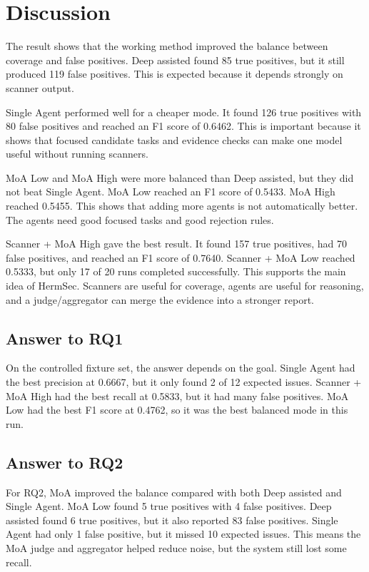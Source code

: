 \documentclass[sigconf,nonacm]{acmart}
\begin{document}
\section{Discussion}

The result shows that the working method improved the balance between coverage and false positives. Deep assisted found 85 true positives, but it still produced 119 false positives. This is expected because it depends strongly on scanner output.

Single Agent performed well for a cheaper mode. It found 126 true positives with 80 false positives and reached an F1 score of 0.6462. This is important because it shows that focused candidate tasks and evidence checks can make one model useful without running scanners.

MoA Low and MoA High were more balanced than Deep assisted, but they did not beat Single Agent. MoA Low reached an F1 score of 0.5433. MoA High reached 0.5455. This shows that adding more agents is not automatically better. The agents need good focused tasks and good rejection rules.

Scanner + MoA High gave the best result. It found 157 true positives, had 70 false positives, and reached an F1 score of 0.7640. Scanner + MoA Low reached 0.5333, but only 17 of 20 runs completed successfully. This supports the main idea of HermSec. Scanners are useful for coverage, agents are useful for reasoning, and a judge/aggregator can merge the evidence into a stronger report.

\subsection{Answer to RQ1}
On the controlled fixture set, the answer depends on the goal. Single Agent had the best precision at 0.6667, but it only found 2 of 12 expected issues. Scanner + MoA High had the best recall at 0.5833, but it had many false positives. MoA Low had the best F1 score at 0.4762, so it was the best balanced mode in this run.

\subsection{Answer to RQ2}
For RQ2, MoA improved the balance compared with both Deep assisted and Single Agent. MoA Low found 5 true positives with 4 false positives. Deep assisted found 6 true positives, but it also reported 83 false positives. Single Agent had only 1 false positive, but it missed 10 expected issues. This means the MoA judge and aggregator helped reduce noise, but the system still lost some recall.
\end{document}
